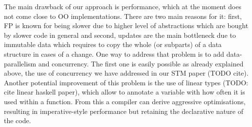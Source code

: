 The main drawback of our approach is performance, which at the moment does not come close to OO implementations. There are two main reasons for it: first, FP is known for being slower due to higher level of abstractions which are bought by slower code in general and second, updates are the main bottleneck due to immutable data which requires to copy the whole (or subparts) of a data structure in cases of a change. One way to address that problem is to add data-parallelism and concurrency. The first one is easily possible as already explained above, the use of concurrency we have addressed in our STM paper (TODO cite). Another potential improvement of this problem is the use of linear types (TODO: cite linear haskell paper), which allow to annotate a variable with how often it is used within a function. From this a compiler can derive aggressive optimisations, resulting in imperative-style performance but retaining the declarative nature of the code.